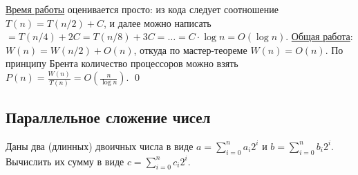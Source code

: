 \underline{Время работы} оценивается просто: из кода следует соотношение $T(n) = T(n/2) + C$, и далее можно написать $= T(n/4) + 2C = T(n/8) + 3C = \ldots = C\cdot\log n = O(\log n)$. \underline{Общая работа}: $W(n) = W(n/2) + O(n)$, откуда по мастер-теореме $W(n) = O(n)$. По принципу Брента количество процессоров можно взять $P(n) = \frac{W(n)}{T(n)} = O(\frac{n}{\log n})$. \qed

\subsection{Параллельное сложение чисел}
\begin{problem*}Даны два (длинных) двоичных числа в виде $a = \sum_{i=0}^n a_i2^i$ и $b = \sum_{i=0}^n b_i2^i$. Вычислить их сумму в виде $c = \sum_{i=0}^n c_i2^i$.
\end{problem*}

